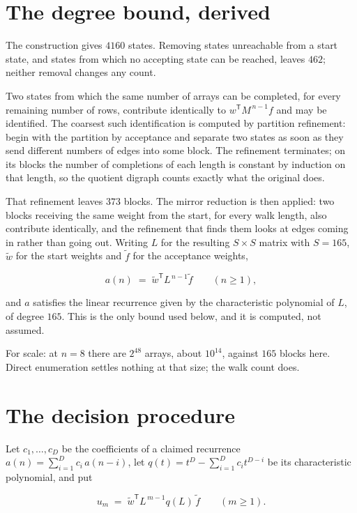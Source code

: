 \documentclass[11pt]{article}
\theoremstyle{definition}
\begin{document}
\section{The degree bound, derived}

The construction gives $4160$ states. Removing states unreachable from a start state, and states from which no accepting state can be reached, leaves $462$; neither removal changes any count.

Two states from which the same number of arrays can be completed, for every remaining number of rows, contribute identically to $w^{\mathsf T}M^{\,n-1}f$ and may be identified. The coarsest such identification is computed by partition refinement: begin with the partition by acceptance and separate two states as soon as they send different numbers of edges into some block. The refinement terminates; on its blocks the number of completions of each length is constant by induction on that length, so the quotient digraph counts exactly what the original does.

That refinement leaves $373$ blocks. The mirror reduction is then applied: two blocks receiving the same weight from the start, for every walk length, also contribute identically, and the refinement that finds them looks at edges coming in rather than going out. Writing $L$ for the resulting $S \times S$ matrix with $S = 165$, $\tilde w$ for the start weights and $\tilde f$ for the acceptance weights,

\[a(n) \;=\; \tilde w^{\mathsf T} L^{\,n-1} \tilde f \qquad (n \ge 1),\]

and $a$ satisfies the linear recurrence given by the characteristic polynomial of $L$, of degree $165$. This is the only bound used below, and it is computed, not assumed.

For scale: at $n = 8$ there are $2^{48}$ arrays, about $10^{14}$, against $165$ blocks here. Direct enumeration settles nothing at that size; the walk count does.

\section{The decision procedure}

Let $c_1,\dots,c_D$ be the coefficients of a claimed recurrence $a(n) = \sum_{i=1}^{D} c_i\,a(n-i)$, let $q(t) = t^{D} - \sum_{i=1}^{D} c_i t^{D-i}$ be its characteristic polynomial, and put

\[u_m \;=\; \tilde w^{\mathsf T} L^{\,m-1} q(L)\,\tilde f \qquad (m \ge 1).\]
\end{document}
